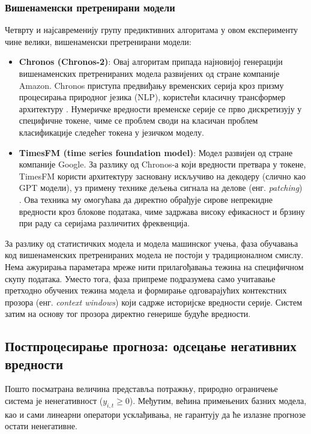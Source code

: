 \documentclass[12pt,oneside]{memoir}
\begin{document}
\subsubsection{Вишенаменски претренирани модели}

Четврту и најсавременију групу предиктивних алгоритама у овом експерименту чине велики, вишенаменски претренирани модели:

\begin{itemize}
	\item \textbf{Chronos (Chronos-2)}: Овај алгоритам припада најновијој генерацији вишенаменских претренираних модела развијених од стране компаније Amazon. Chronos приступа предвиђању временских серија кроз призму процесирања природног језика (NLP), користећи класичну трансформер архитектуру \cite{ansari2024chronos}. Нумеричке вредности временске серије се прво дискретизују у специфичне токене, чиме се проблем своди на класичан проблем класификације следећег токена у језичком моделу.

    
    	\item \textbf{TimesFM (time series foundation model)}: Модел развијен од стране компаније Google. За разлику од Chronos-а који вредности претвара у токене, TimesFM користи архитектуру засновану искључиво на декодеру (слично као GPT модели), уз примену технике дељења сигнала на делове (енг. \textit{patching})  \cite{das2023timesfm}. Ова техника му омогућава да директно обрађује сирове непрекидне вредности кроз блокове података, чиме задржава високу ефикасност и брзину при раду са серијама различитих фреквенција.
\end{itemize}

За разлику од статистичких модела и модела машинског учења, фаза обучавања код вишенаменских претренираних модела не постоји у традиционалном смислу. Нема ажурирања параметара мреже нити прилагођавања тежина на специфичном скупу података. Уместо тога, фаза припреме подразумева само учитавање претходно обучених тежина модела и формирање одговарајућих контекстних прозора (енг. \textit{context windows}) који садрже историјске вредности серије. Систем затим на основу тог прозора директно генерише будуће вредности.

\subsection{Постпроцесирање прогноза: одсецање негативних вредности}

Пошто посматрана величина представља потражњу, природно ограничење система је ненегативност ($y_{i,t} \geq 0$). Међутим, већина примењених базних модела, као и сами линеарни оператори усклађивања, не гарантују да ће излазне прогнозе остати ненегативне.
\end{document}
